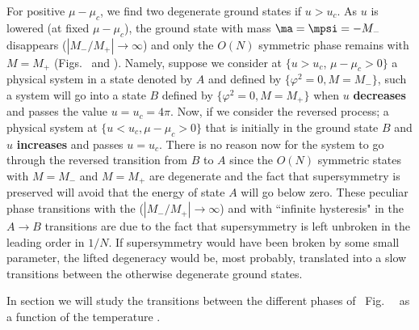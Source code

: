 \endinsert

For positive $\mu-\mu_c$, we find two degenerate ground states if
$ u  > u_c $. As $u$ is lowered (at fixed $\mu-\mu_c$), the ground
state with mass $\ma=\mpsi=-M_-$ disappears ($|M_-/ M_+| \to
\infty$) and only the $O(N)$ symmetric phase remains with $M=M_+$
(Figs.~\label{\ZeroTone}  and \label{\ZeroTtwo}). Namely, suppose
we consider at $\{ u>u_c$, $\mu-\mu_c>0\}$ a physical system in a
state denoted by $A$ and defined by $\{\varphi^2=0, M=M_-\}$, such
a system will go into a state $B$ defined by $\{\varphi^2=0,
M=M_+\}$ when $u$ {\bf decreases} and passes the value $u=u_c=
4\pi $. Now, if we consider the reversed process; a physical
system at $\{ u < u_c , \mu-\mu_c> 0 \}$ that is initially in the
ground state $B$ and $u$ {\bf increases }and
 passes  $u=u_c$. There is no reason now for the
system to go through  the reversed transition from $B$ to $A$
since the $O(N)$ symmetric states with $M=M_-$ and $M=M_+$ are
degenerate and the fact that supersymmetry is preserved will avoid
that the energy of state $A$ will go below zero. These peculiar
phase transitions with the  ($|M_-/ M_+| \to \infty$) and with
``infinite hysteresis" in the $A \to B$ transitions are due to the
fact that supersymmetry is left unbroken in the leading order in
$1/N$. If supersymmetry would have been broken by some small
parameter, the lifted degeneracy would be, most probably,
translated into a slow transitions between the otherwise
degenerate ground states.

\smallskip




In section \label{\ssNSUSYT} we will study the transitions between
the different phases of ~Fig.~\phases~ as a function of the
temperature .

